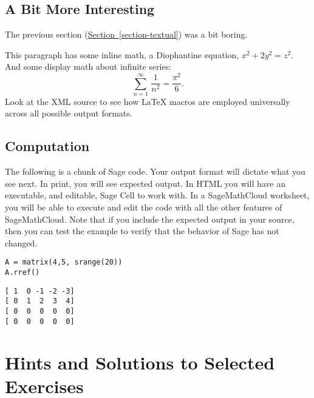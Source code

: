 \documentclass[10pt,]{book}
\theoremstyle{plain}
\theoremstyle{definition}
\newcommand{\doubler}[1]{2#1}
\begin{document}
\section[{A Bit More Interesting}]{A Bit More Interesting}\label{section-interesting}
The previous section (\hyperref[section-textual]{Section~\ref{section-textual}}) was a bit boring.%
\par
This paragraph has some inline math, a Diophantine equation, \(x^2 + \doubler{y^2} = z^2\).  And some display math about infinite series: \begin{equation*}\sum_{n=1}^\infty\,\frac{1}{n^2} = \frac{\pi^2}{6}.\end{equation*}  Look at the XML source to see how \LaTeX{} macros are employed universally across all possible output formats.%
\typeout{************************************************}
\typeout{************************************************}
\section[{Computation}]{Computation}\label{section-computation}
The following is a chunk of Sage code.  Your output format will dictate what you see next.  In print, you will see expected output.  In HTML you will have an executable, and editable, Sage Cell to work with.  In a SageMathCloud worksheet, you will be able to execute and edit the code with all the other features of SageMathCloud.  Note that if you include the expected output in your source, then you can test the example to verify that the behavior of Sage has not changed.%
\begin{lstlisting}[style=sageinput]
A = matrix(4,5, srange(20))
A.rref()
\end{lstlisting}
\begin{lstlisting}[style=sageoutput]
[ 1  0 -1 -2 -3]
[ 0  1  2  3  4]
[ 0  0  0  0  0]
[ 0  0  0  0  0]
\end{lstlisting}
%
%
%
\appendix
%
\typeout{************************************************}
\typeout{************************************************}
\chapter[{Hints and Solutions to Selected Exercises}]{Hints and Solutions to Selected Exercises}\label{appendix-1}
\end{document}
